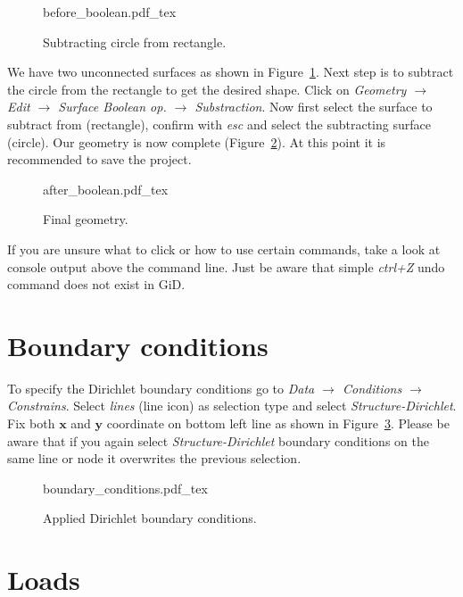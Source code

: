 \documentclass[10pt,a4paper]{article}
\begin{document}
\begin{figure}[ht]
	\centering
	\footnotesize
    \def\svgwidth{0.9\textwidth}{before_boolean.pdf_tex}
	\caption{Subtracting circle from rectangle.}
	\label{im:before_boolean}
\end{figure}

We have two unconnected surfaces as shown in Figure~\ref{im:before_boolean}. Next step is to subtract the circle from the rectangle to get the desired shape. Click on \textit{Geometry $\rightarrow$ Edit $\rightarrow$ Surface Boolean op. $\rightarrow$ Substraction}. Now first select the surface to subtract from (rectangle), confirm with \textit{esc} and select the subtracting surface (circle). Our geometry is now complete (Figure~\ref{im:after_boolean}). At this point it is recommended to save the project. \\

\begin{figure}[ht]
	\centering
	\footnotesize
    \def\svgwidth{0.9\textwidth}{after_boolean.pdf_tex}
	\caption{Final geometry.}
	\label{im:after_boolean}
\end{figure}

If you are unsure what to click or how to use certain commands, take a look at console output above the command line. Just be aware that simple \textit{ctrl+Z} undo command does not exist in GiD.


\section{Boundary conditions}

To specify the Dirichlet boundary conditions go to \textit{Data $\rightarrow$ Conditions $\rightarrow$ Constrains}. Select \textit{lines} (line icon) as selection type and select \textit{Structure-Dirichlet}. Fix both $\mathbf{x}$ and $\mathbf{y}$ coordinate on bottom left line as shown in Figure~\ref{im:boundary_conditions}. Please be aware that if you again select \textit{Structure-Dirichlet} boundary conditions on the same line or node it overwrites the previous selection.

\begin{figure}[ht]
	\centering
	\footnotesize
    \def\svgwidth{0.9\textwidth}{boundary_conditions.pdf_tex}
	\caption{Applied Dirichlet boundary conditions.}
	\label{im:boundary_conditions}
\end{figure}

\section{Loads}
\end{document}

